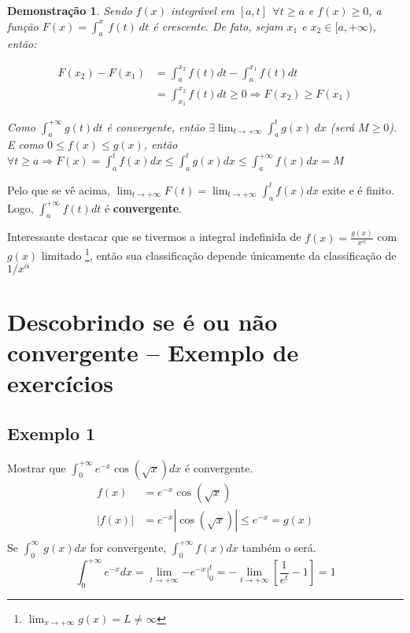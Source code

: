 \documentclass[12pt,openany, letterpaper]{book}
\newtheorem{demonstration}{Demonstração}
\begin{document}
\begin{demonstration}
Sendo $f(x)$ integrável em $[a,t] \ \ \forall t \geq a$ e $f(x) \geq 0$, a função $\displaystyle{F(x) = \int_a^x\ f(t)\ dt}$ é crescente. De fato, sejam $x_1$ e $x_2 \in [a,+\infty)$, então:

\begin{align*}
F(x_2)-F(x_1) &= \int_a^{x_2} f(t)dt - \int_a^{x_1} f(t)dt \\
&= \int_{x_1}^{x_2} f(t)dt \geq 0 \Rightarrow F(x_2) \geq F(x_1)
\end{align*}

Como $\displaystyle{\int_a^{+\infty} g(t)dt}$ é convergente, então $\displaystyle{\exists \lim_{t \rightarrow +\infty} \int_a^t g(x)\ dx} $ (será $M \geq 0$). E como $0 \leq f(x) \leq g(x)$, então $\forall t \geq a \Rightarrow F(x) = \int_a^t f(x)dx \leq \int_a^t g(x)dx \leq \int_a^{+\infty} f(x)dx = M$
\end{demonstration}
\vspace{10pt}

Pelo que se vê acima, $\displaystyle{\lim_{t\rightarrow+\infty} F(t) = \lim_{t\rightarrow+\infty} \int_a^t f(x)dx}$ exite e é finito. Logo, $\displaystyle{\int_a^{+\infty} f(t)dt}$ é \textbf{convergente}.

Interessante destacar que se tivermos a integral indefinida de $\displaystyle{f(x) =  \frac{g(x)}{x^{\alpha}}}$ com $g(x)$ limitado \footnote{$\displaystyle{\lim_{x \rightarrow +\infty} g(x)} = L \neq \infty $}, então sua classificação depende únicamente da classificação de $1 /x^\alpha$ 

\section{Descobrindo se é ou não convergente -- Exemplo de exercícios}
\label{sec:s14}

\subsection*{Exemplo 1}
\label{sub:ex141}

Mostrar que $\displaystyle{\int_0^{+\infty} e^{-x} \cos(\sqrt x) dx} $ é  convergente.
\begin{align*}
f(x) &= e^{-x} \cos(\sqrt x) \\
|f(x)| &= e^{-x}  |\cos(\sqrt x)| \leq e^{-x} = g(x) \\
\end{align*}
Se $\displaystyle{\int_0^\infty \ g(x)dx}$ for convergente, $\displaystyle{\int_0^{+\infty}f(x)dx }$ também o será.
$$ \int_0^{+\infty}e^{-x}dx = \lim_{t \rightarrow +\infty} \left.-e^{-x} \right|_0^t = - \lim_{t \rightarrow +\infty} \left[\frac{1}{e^t}-1 \right] = 1$$
\end{document}
